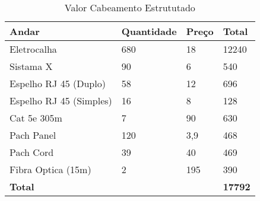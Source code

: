 \begin{table}[H]
\centering
\caption{Valor Cabeamento Estrututado}
\label{my-label}
\begin{tabular}{|l|l|l|l|}
\hline
\textbf{Andar}          & \textbf{Quantidade} & \textbf{Preço} & \textbf{Total} \\ \hline
Eletrocalha             & 680                 & 18             & 12240          \\ \hline
Sistama X               & 90                  & 6              & 540            \\ \hline
Espelho RJ 45 (Duplo)   & 58                  & 12             & 696            \\ \hline
Espelho RJ 45 (Simples) & 16                  & 8              & 128            \\ \hline
Cat 5e 305m             & 7                   & 90             & 630            \\ \hline
Pach Panel              & 120                 & 3,9            & 468            \\ \hline
Pach Cord               & 39                  & 40             & 469            \\ \hline
Fibra Optica (15m)      & 2                   & 195            & 390            \\ \hline
\textbf{Total}          &                     &                & \textbf{17792} \\ \hline
\end{tabular}
\end{table}